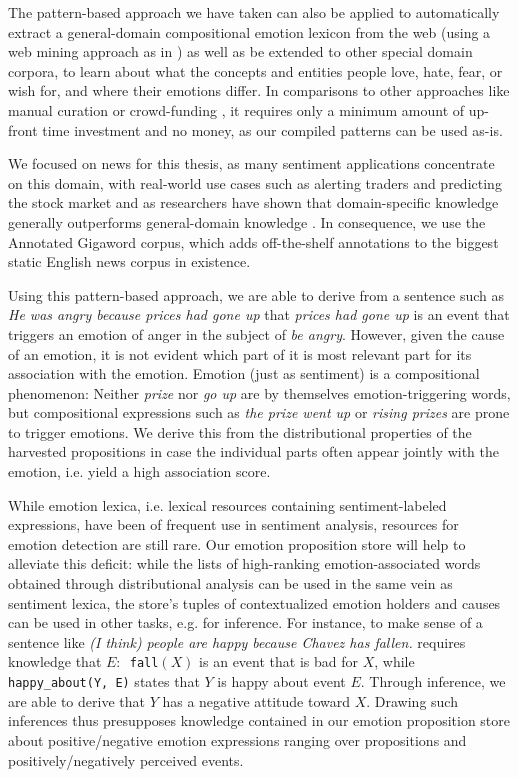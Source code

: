 The pattern-based approach we have taken can also be applied to automatically extract a general-domain compositional emotion lexicon from the web (using a web mining approach as in \cite{mutual_action}) as well as be extended to other special domain corpora, to learn about what the concepts and entities people love, hate, fear, or wish for, and where their emotions differ. In comparisons to other approaches like manual curation or crowd-funding \cite{nrc}, it requires only a minimum amount of up-front time investment and no money, as our compiled patterns can be used as-is.

We focused on news for this thesis, as many sentiment applications concentrate on this domain, with real-world use cases such as alerting traders and predicting the stock market \cite{predict_stock_market} and as researchers have shown that domain-specific knowledge generally outperforms general-domain knowledge \cite{implicit_emotions}. In consequence, we use the Annotated Gigaword \cite{annotated_gigaword} corpus, which adds off-the-shelf annotations to the biggest static English news corpus in existence.

Using this pattern-based approach, we are able to derive from a sentence such as \textit{He was angry because prices had gone up} that \textit{prices had gone up} is an event that triggers an emotion of anger in the subject of \textit{be angry}. However, given the cause of an emotion, it is not evident which part of it is most relevant part for its association with the emotion. Emotion (just as sentiment) is a compositional phenomenon: Neither \textit{prize} nor \textit{go up} are by themselves emotion-triggering words, but compositional expressions such as \textit{the prize went up} or \textit{rising prizes} are prone to trigger emotions. We derive this from the distributional properties of the harvested propositions in case the individual parts often appear jointly with the emotion, i.e. yield a high association score.

While emotion lexica, i.e. lexical resources containing sentiment-labeled expressions, have been of frequent use in sentiment analysis, resources for emotion detection are still rare. Our emotion proposition store will help to alleviate this deficit: while the lists of high-ranking emotion-associated words obtained through distributional analysis can be used in the same vein as sentiment lexica, the store's tuples of contextualized emotion holders and causes can be used in other tasks, e.g. for inference. For instance, to make sense of a sentence like \textit{(I think) people are happy because Chavez has fallen.} \cite{benfactive_malefactive} requires knowledge that \texttt{$E:$ \texttt{fall}$(X)$} is an event that is bad for $X$, while \texttt{happy\_about(Y, E)} states that $Y$ is happy about event $E$. Through inference, we are able to derive that $Y$ has a negative attitude toward $X$. Drawing such inferences thus presupposes knowledge contained in our emotion proposition store about positive/negative emotion expressions ranging over propositions and positively/negatively perceived events.

